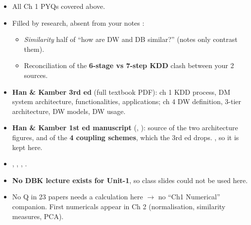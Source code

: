 \begin{itemize}
  \item All Ch 1 PYQs covered above.
  \item Filled by research, absent from your notes \added:
  \begin{itemize}
    \item \emph{Similarity} half of ``how are DW and DB similar?''  (notes only contrast them).
    \item Reconciliation of the \textbf{6-stage vs 7-step KDD} clash between your 2 sources.
  \end{itemize}
\end{itemize}

\begin{itemize}
  \item \textbf{Han \& Kamber 3rd ed} (full textbook PDF): ch 1 KDD process, DM system architecture,
        functionalities, applications; ch 4 DW definition, 3-tier architecture, DW models, DW usage.
  \item \textbf{Han \& Kamber 1st ed manuscript} (, ): source of the
        two architecture figures, and of the \textbf{4 coupling schemes}, which the 3rd ed drops.
        , so it is kept here.
  \item {}, ,
        , .
  \item \textbf{No DBK lecture exists for Unit-1}, so class slides could not be used here.
\end{itemize}

\begin{itemize}
  \item {} No Q in 23 papers needs a calculation here
        $\rightarrow$ no ``Ch1 Numerical'' companion. First numericals appear in Ch 2
        (normalisation, similarity measures, PCA).
\end{itemize}
